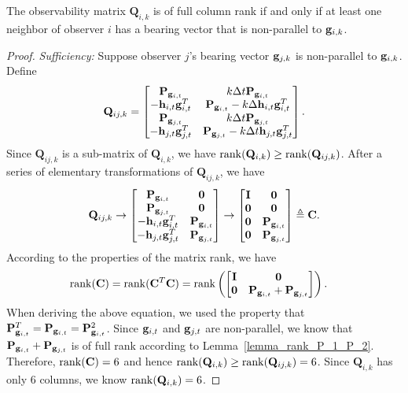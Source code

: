 \documentclass[letterpaper, 10 pt, conference]{ieeeconf}  %
\begin{document}
\begin{theorem}\label{theo_multi_obs}
The observability matrix $\mathbf{Q}_{i,k}$ is of full column rank if and only if at least one neighbor of observer $i$ has a bearing vector that is non-parallel to $\mathbf{g}_{i,k}$.
\end{theorem}
\begin{proof}
\emph{Sufficiency:}
Suppose observer $j$'s bearing vector $\mathbf{g}_{j,k}$ is non-parallel to $\mathbf{g}_{i,k}$.
Define
\begin{align}
\mathbf{Q}_{ij,k} = \begin{bmatrix}
\mathbf{P}_{\mathbf{g}_{i,t}} & k\Delta t\mathbf{P}_{\mathbf{g}_{i,t}}\\
-\mathbf{h}_{i,t}\mathbf{g}_{i,t}^T & \mathbf{P}_{\mathbf{g}_{i,t}} - k\Delta\mathbf{h}_{i,t}\mathbf{g}_{i,t}^T  \\
\mathbf{P}_{\mathbf{g}_{j, t}} &k\Delta t\mathbf{P}_{\mathbf{g}_{j, t}}\\
-\mathbf{h}_{j, t}\mathbf{g}_{j, t}^T & \mathbf{P}_{\mathbf{g}_{j, t}} - k\Delta t\mathbf{h}_{j, t}\mathbf{g}_{j, t}^T
\end{bmatrix}.
\end{align}		
Since $\mathbf{Q}_{ij,k}$ is a sub-matrix of $\mathbf{Q}_{i,k}$, we have ${\rm rank}(\mathbf{Q}_{i,k}) \ge {\rm rank}(\mathbf{Q}_{ij,k})$.
After a series of elementary transformations of $\mathbf{Q}_{ij,k}$, we have
\begin{align*}
\mathbf{Q}_{ij,k} \rightarrow  \begin{bmatrix}
\mathbf{P}_{\mathbf{g}_{i,t}} & \mathbf{0}\\
\mathbf{P}_{\mathbf{g}_{j, t}} & \mathbf{0}\\
-\mathbf{h}_{i,t}\mathbf{g}_{i,t}^T & \mathbf{P}_{\mathbf{g}_{i,t}}  \\
-\mathbf{h}_{j, t}\mathbf{g}_{j, t}^T & \mathbf{P}_{\mathbf{g}_{j, t}}
\end{bmatrix}\rightarrow \begin{bmatrix}
\mathbf{I} & \mathbf{0}\\
\mathbf{0} &\mathbf{0}\\
\mathbf{0} & \mathbf{P}_{\mathbf{g}_{i,t}} \\
\mathbf{0} & \mathbf{P}_{\mathbf{g}_{j, t}}
\end{bmatrix}\triangleq \mathbf{C}.
\end{align*}
According to the properties of the matrix rank, we have
\begin{align*}
{\rm rank}(\mathbf{C}) & = {\rm rank}(\mathbf{C}^{T}\mathbf{C}) = {\rm rank}\left(\begin{bmatrix}
\mathbf{I} & \mathbf{0}\\
\mathbf{0} & \mathbf{P}_{\mathbf{g}_{i,t}}+ \mathbf{P}_{\mathbf{g}_{j, t}}
\end{bmatrix}\right).
\end{align*}
When deriving the above equation, we used the property that $\mathbf{P}_{\mathbf{g}_{i,t}}^T = \mathbf{P}_{\mathbf{g}_{i,t}} = \mathbf{P}_{\mathbf{g}_{i,t}}^2$.
Since $\mathbf{g}_{i,t}$ and $\mathbf{g}_{j,t}$ are non-parallel, we know that $\mathbf{P}_{\mathbf{g}_{i,t}}+ \mathbf{P}_{\mathbf{g}_{j, t}}$ is of full rank according to Lemma~\ref{lemma_rank_P_1_P_2}.
Therefore, ${\rm rank }(\mathbf{C})=6$ and hence ${\rm rank}(\mathbf{Q}_{i,k})\ge {\rm rank}(\mathbf{Q}_{ij,k})=6$. Since $\mathbf{Q}_{i,k}$ has only 6 columns, we know ${\rm rank}(\mathbf{Q}_{i,k})=6$.


\end{proof}
\end{document}
